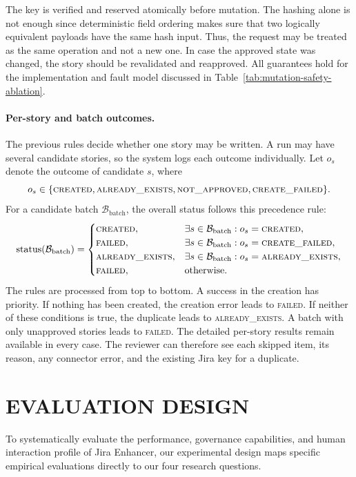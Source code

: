 \documentclass[manuscript,review]{acmart}
\begin{document}
The key is verified and reserved atomically before mutation. The hashing alone is not enough since deterministic field ordering makes sure that two logically equivalent payloads have the same hash input. Thus, the request may be treated as the same operation and not a new one. In case the approved state was changed, the story should be revalidated and reapproved. All guarantees hold for the implementation and fault model discussed in Table~\ref{tab:mutation-safety-ablation}.

\paragraph{Per-story and batch outcomes.}
The previous rules decide whether one story may be written. A run may have several candidate stories, so the system logs each outcome individually. Let $o_s$ denote the outcome of candidate $s$, where
\[
o_s\in\{\textsc{created},\textsc{already\_exists},\textsc{not\_approved},\textsc{create\_failed}\}.
\]
For a candidate batch $\mathcal{B}_{\mathrm{batch}}$, the overall status follows this precedence rule:
\begin{equation}
\operatorname{status}(\mathcal{B}_{\mathrm{batch}})=
\begin{cases}
\textsc{created}, & \exists s\in \mathcal{B}_{\mathrm{batch}}: o_s=\textsc{created},\\
\textsc{failed}, & \exists s\in \mathcal{B}_{\mathrm{batch}}: o_s=\textsc{create\_failed},\\
\textsc{already\_exists}, & \exists s\in \mathcal{B}_{\mathrm{batch}}: o_s=\textsc{already\_exists},\\
\textsc{failed}, & \text{otherwise}.
\end{cases}
\end{equation}
The rules are processed from top to bottom. A success in the creation has priority. If nothing has been created, the creation error leads to \textsc{failed}. If neither of these conditions is true, the duplicate leads to \textsc{already\_exists}. A batch with only unapproved stories leads to \textsc{failed}. The detailed per-story results remain available in every case. The reviewer can therefore see each skipped item, its reason, any connector error, and the existing Jira key for a duplicate.

\FloatBarrier
\section{EVALUATION DESIGN}
To systematically evaluate the performance, governance capabilities, and human interaction profile of Jira Enhancer, our experimental design maps specific empirical evaluations directly to our four research questions.
\end{document}
